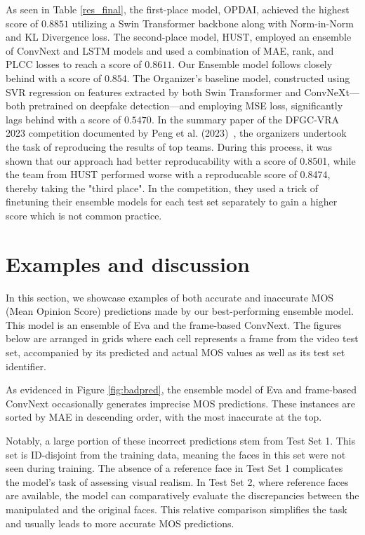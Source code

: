 \documentclass[a4paper,12pt,openright]{book}
\begin{document}
As seen in Table \ref{res_final}, the first-place model, OPDAI, achieved the highest score of \(0.8851\) utilizing a Swin Transformer backbone along with Norm-in-Norm and KL Divergence loss. The second-place model, HUST, employed an ensemble of ConvNext and LSTM models and used a combination of MAE, rank, and PLCC losses to reach a score of \(0.8611\). Our Ensemble model follows closely behind with a score of \(0.854\). The Organizer's baseline model, constructed using SVR regression on features extracted by both Swin Transformer and ConvNeXt—both pretrained on deepfake detection—and employing MSE loss, significantly lags behind with a score of \(0.5470\). In the summary paper of the DFGC-VRA 2023 competition documented by Peng et al. (2023)~\cite{peng_etal_2023}, the organizers undertook the task of reproducing the results of top teams. During this process, it was shown that our approach had better reproducability with a score of 0.8501, while the team from HUST  performed worse with a reproducable score of 0.8474, thereby taking the "third place". In the competition, they used a trick of finetuning their ensemble models for each test set separately to gain a higher score which is not common practice.







\newpage

\section{Examples and discussion}
In this section, we showcase examples of both accurate and inaccurate MOS (Mean Opinion Score) predictions made by our best-performing ensemble model. This model is an ensemble of Eva and the frame-based ConvNext. The figures below are arranged in grids where each cell represents a frame from the video test set, accompanied by its predicted and actual MOS values as well as its test set identifier.

As evidenced in Figure \ref{fig:badpred}, the ensemble model of Eva and frame-based ConvNext occasionally generates imprecise MOS predictions. These instances are sorted by MAE in descending order, with the most inaccurate at the top.

Notably, a large portion of these incorrect predictions stem from Test Set 1. This set is ID-disjoint from the training data, meaning the faces in this set were not seen during training. The absence of a reference face in Test Set 1 complicates the model's task of assessing visual realism. In Test Set 2, where reference faces are available, the model can comparatively evaluate the discrepancies between the manipulated and the original faces. This relative comparison simplifies the task and usually leads to more accurate MOS predictions.
\end{document}
